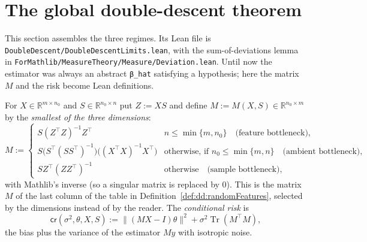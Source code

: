 \section{The global double-descent theorem}\label{sec:dd:global}

This section assembles the three regimes. Its Lean file is \texttt{DoubleDescent/DoubleDescentLimits.lean}, with the sum-of-deviations lemma in \texttt{ForMathlib/MeasureTheory/Measure/Deviation.lean}. Until now the estimator was
always an abstract \texttt{β\_hat} satisfying a hypothesis; here the matrix $M$ and the risk become Lean definitions.

\begin{definition}\label{def:dd:minNormOperator}
  \leanok
For $X\in\mathbb R^{m\times n_0}$ and $S\in\mathbb R^{n_0\times n}$ put $Z:=XS$ and define $M:=M(X,S)\in\mathbb R^{n_0\times m}$ by the \emph{smallest of the three dimensions}:
\[
  M:=\begin{cases}
  S(Z^\top Z)^{-1}Z^\top & n\le\min\{m,n_0\}\quad\text{(feature bottleneck)},\\[0.5ex]
  S\bigl(S^\top(SS^\top)^{-1}\bigr)\bigl((X^\top X)^{-1}X^\top\bigr) & \text{otherwise, if } n_0\le\min\{m,n\}\quad\text{(ambient bottleneck)},\\[0.5ex]
  SZ^\top(ZZ^\top)^{-1} & \text{otherwise}\quad\text{(sample bottleneck)},
  \end{cases}
\]
with Mathlib's inverse (so a singular matrix is replaced by $0$). This is the matrix $M$ of the last column of the table in Definition~\ref{def:dd:randomFeatures}, selected by the dimensions instead of by the reader. The \emph{conditional risk} is
\[
  \mathsf{cr}(\sigma^2,\theta,X,S):=\|(MX-I)\theta\|^2+\sigma^2\operatorname{Tr}(M^\top M),
\]
the bias plus the variance of the estimator $My$ with isotropic noise.
\end{definition}

